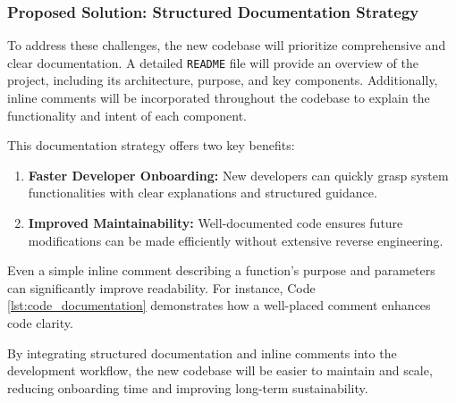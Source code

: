 \subsubsection{Proposed Solution: Structured Documentation Strategy}
To address these challenges, the new codebase will prioritize comprehensive and clear documentation. A detailed \texttt{README} file will provide an overview of the project, including its architecture, purpose, and key components. Additionally, inline comments will be incorporated throughout the codebase to explain the functionality and intent of each component.

This documentation strategy offers two key benefits:
\begin{enumerate}
    \item \textbf{Faster Developer Onboarding:} New developers can quickly grasp system functionalities with clear explanations and structured guidance.
    \item \textbf{Improved Maintainability:} Well-documented code ensures future modifications can be made efficiently without extensive reverse engineering.
\end{enumerate}

Even a simple inline comment describing a function’s purpose and parameters can significantly improve readability. For instance, Code \ref{lst:code_documentation} demonstrates how a well-placed comment enhances code clarity.

By integrating structured documentation and inline comments into the development workflow, the new codebase will be easier to maintain and scale, reducing onboarding time and improving long-term sustainability.
